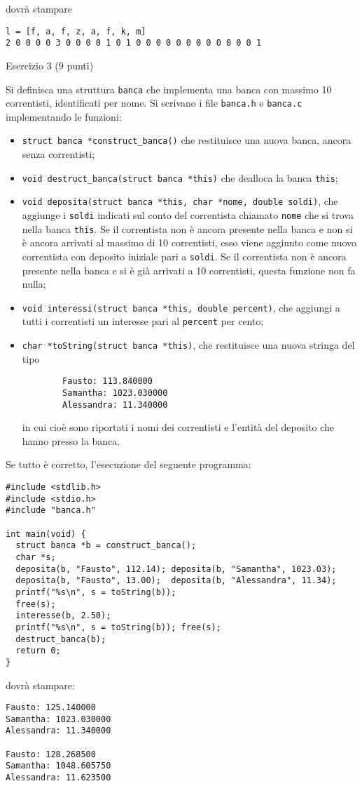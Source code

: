 \documentclass[12pt]{article}
\begin{document}
\noindent
dovr\`a stampare
%
{\small
\begin{verbatim}
l = [f, a, f, z, a, f, k, m]
2 0 0 0 0 3 0 0 0 0 1 0 1 0 0 0 0 0 0 0 0 0 0 0 0 1
\end{verbatim}}

\vspace*{1ex}
\begin{center}{\Large Esercizio 3} ($9$ punti)\end{center}
%
Si definisca una struttura \texttt{banca} che implementa una banca con massimo 10 correntisti,
identificati per nome.
Si scrivano i file \texttt{banca.h} e \texttt{banca.c} implementando le funzioni:
%
\begin{itemize}
\item \texttt{struct banca *construct\_banca()} che restituisce una nuova banca,
      ancora senza correntisti;
\item \texttt{void destruct\_banca(struct banca *this)} che dealloca la banca \texttt{this};
\item \texttt{void deposita(struct banca *this, char *nome, double soldi)},
      che aggiunge i \texttt{soldi} indicati sul conto del correntista chiamato \texttt{nome} che si
      trova nella banca \texttt{this}. Se il correntista non \`e ancora presente
      nella banca e non si
      \`e ancora arrivati al massimo di 10 correntisti, esso viene aggiunto come nuovo correntista con deposito
      iniziale pari a \texttt{soldi}.  Se il correntista non \`e ancora presente
      nella banca e si \`e gi\`a arrivati a 10 correntisti, questa funzione non
      fa nulla;
\item \texttt{void interessi(struct banca *this, double percent)}, che aggiungi
      a tutti i correntisti un interesse pari al \texttt{percent} per cento;
\item \texttt{char *toString(struct banca *this)}, che restituisce una nuova stringa del tipo
      \vspace{-1ex}
      \begin{verbatim}
        Fausto: 113.840000
        Samantha: 1023.030000
        Alessandra: 11.340000
      \end{verbatim}
      \vspace{-3ex}
      in cui cio\`e sono riportati i nomi dei correntisti e l'entit\`a del deposito che hanno presso
      la banca.
\end{itemize}
%
Se tutto \`e corretto, l'esecuzione del seguente programma:

{\small
\begin{verbatim}
#include <stdlib.h>
#include <stdio.h>
#include "banca.h"

int main(void) {
  struct banca *b = construct_banca();
  char *s;
  deposita(b, "Fausto", 112.14); deposita(b, "Samantha", 1023.03);
  deposita(b, "Fausto", 13.00);  deposita(b, "Alessandra", 11.34);
  printf("%s\n", s = toString(b));
  free(s);
  interesse(b, 2.50);
  printf("%s\n", s = toString(b)); free(s);
  destruct_banca(b);
  return 0;
}
\end{verbatim}}

\noindent
dovr\`a stampare:

{\small
\begin{verbatim}
Fausto: 125.140000
Samantha: 1023.030000
Alessandra: 11.340000

Fausto: 128.268500
Samantha: 1048.605750
Alessandra: 11.623500
\end{verbatim}}
\end{document}
